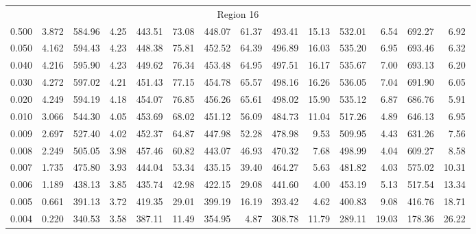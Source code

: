 \begin{tabular}{@{}lrrrrrrrrrrrrr@{}}
\midrule
\multicolumn{14}{c}{Region 16} \\
\cmidrule{1-14}
0.500 & 3.872 & 584.96 & 4.25 & 443.51 & 73.08 & 448.07 & 61.37 & 493.41 & 15.13 & 532.01 & 6.54 & 692.27 & 6.92 \\
0.050 & 4.162 & 594.43 & 4.23 & 448.38 & 75.81 & 452.52 & 64.39 & 496.89 & 16.03 & 535.20 & 6.95 & 693.46 & 6.32 \\
0.040 & 4.216 & 595.90 & 4.23 & 449.62 & 76.34 & 453.48 & 64.95 & 497.51 & 16.17 & 535.67 & 7.00 & 693.13 & 6.20 \\
0.030 & 4.272 & 597.02 & 4.21 & 451.43 & 77.15 & 454.78 & 65.57 & 498.16 & 16.26 & 536.05 & 7.04 & 691.90 & 6.05 \\
0.020 & 4.249 & 594.19 & 4.18 & 454.07 & 76.85 & 456.26 & 65.61 & 498.02 & 15.90 & 535.12 & 6.87 & 686.76 & 5.91 \\
0.010 & 3.066 & 544.30 & 4.05 & 453.69 & 68.02 & 451.12 & 56.09 & 484.73 & 11.04 & 517.26 & 4.89 & 646.13 & 6.95 \\
0.009 & 2.697 & 527.40 & 4.02 & 452.37 & 64.87 & 447.98 & 52.28 & 478.98 & 9.53 & 509.95 & 4.43 & 631.26 & 7.56 \\
0.008 & 2.249 & 505.05 & 3.98 & 457.46 & 60.82 & 443.07 & 46.93 & 470.32 & 7.68 & 498.99 & 4.04 & 609.27 & 8.58 \\
0.007 & 1.735 & 475.80 & 3.93 & 444.04 & 53.34 & 435.15 & 39.40 & 464.27 & 5.63 & 481.82 & 4.03 & 575.02 & 10.31 \\
0.006 & 1.189 & 438.13 & 3.85 & 435.74 & 42.98 & 422.15 & 29.08 & 441.60 & 4.00 & 453.19 & 5.13 & 517.54 & 13.34 \\
0.005 & 0.661 & 391.13 & 3.72 & 419.35 & 29.01 & 399.19 & 16.19 & 393.42 & 4.62 & 400.83 & 9.08 & 416.76 & 18.71 \\
0.004 & 0.220 & 340.53 & 3.58 & 387.11 & 11.49 & 354.95 & 4.87 & 308.78 & 11.79 & 289.11 & 19.03 & 178.36 & 26.22 \\


\end{tabular}
